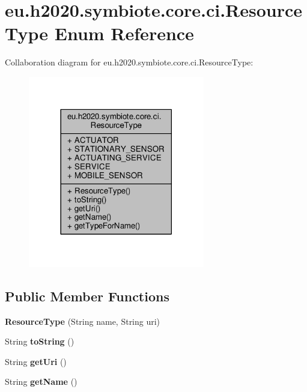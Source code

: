 \hypertarget{enumeu_1_1h2020_1_1symbiote_1_1core_1_1ci_1_1ResourceType}{}\section{eu.\+h2020.\+symbiote.\+core.\+ci.\+Resource\+Type Enum Reference}
\label{enumeu_1_1h2020_1_1symbiote_1_1core_1_1ci_1_1ResourceType}


Collaboration diagram for eu.\+h2020.\+symbiote.\+core.\+ci.\+Resource\+Type\+:
\nopagebreak
\begin{figure}[H]
\begin{center}
\leavevmode
\includegraphics[width=218pt]{enumeu_1_1h2020_1_1symbiote_1_1core_1_1ci_1_1ResourceType__coll__graph}
\end{center}
\end{figure}
\subsection*{Public Member Functions}
\begin{DoxyCompactItemize}
\item 
\mbox{\label{enumeu_1_1h2020_1_1symbiote_1_1core_1_1ci_1_1ResourceType_a9605a2b4e43ce9068c3e1b802af6340e}} 
{\bfseries Resource\+Type} (String name, String uri)
\item 
\mbox{\label{enumeu_1_1h2020_1_1symbiote_1_1core_1_1ci_1_1ResourceType_ae655213ea7417d3c094fcf177b9985eb}} 
String {\bfseries to\+String} ()
\item 
\mbox{\label{enumeu_1_1h2020_1_1symbiote_1_1core_1_1ci_1_1ResourceType_a73ff060113a7e4d0534c1b55f3322493}} 
String {\bfseries get\+Uri} ()
\item 
\mbox{\label{enumeu_1_1h2020_1_1symbiote_1_1core_1_1ci_1_1ResourceType_abc6306cfecfa44edbf2e029847c3f189}} 
String {\bfseries get\+Name} ()
\end{DoxyCompactItemize}
